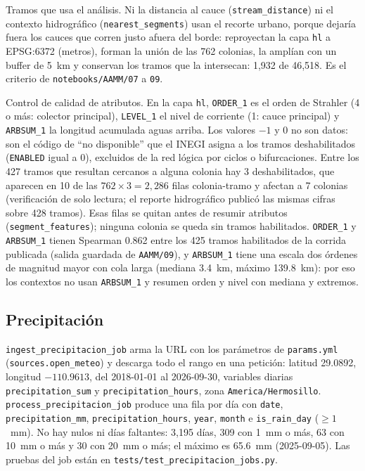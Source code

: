 \documentclass[11pt]{article}
\newcommand{\cod}[1]{\nolinkurl{#1}}
\begin{document}
Tramos que usa el análisis. Ni la distancia al cauce (\cod{stream_distance}) ni el contexto hidrográfico (\cod{nearest_segments}) usan el recorte urbano, porque dejaría fuera los cauces que corren justo afuera del borde: reproyectan la capa \cod{hl} a EPSG:6372 (metros), forman la unión de las 762 colonias, la amplían con un buffer de 5~km y conservan los tramos que la intersecan: 1,932 de 46,518. Es el criterio de \cod{notebooks/AAMM/07} a \cod{09}.

Control de calidad de atributos. En la capa \cod{hl}, \cod{ORDER_1} es el orden de Strahler (4 o más: colector principal), \cod{LEVEL_1} el nivel de corriente (1: cauce principal) y \cod{ARBSUM_1} la longitud acumulada aguas arriba. Los valores $-1$ y 0 no son datos: son el código de ``no disponible'' que el INEGI asigna a los tramos deshabilitados (\cod{ENABLED} igual a 0), excluidos de la red lógica por ciclos o bifurcaciones. Entre los 427 tramos que resultan cercanos a alguna colonia hay 3 deshabilitados, que aparecen en 10 de las $762\times 3=2{,}286$ filas colonia-tramo y afectan a 7 colonias (verificación de solo lectura; el reporte hidrográfico publicó las mismas cifras sobre 428 tramos). Esas filas se quitan antes de resumir atributos (\cod{segment_features}); ninguna colonia se queda sin tramos habilitados. \cod{ORDER_1} y \cod{ARBSUM_1} tienen Spearman 0.862 entre los 425 tramos habilitados de la corrida publicada (salida guardada de \cod{AAMM/09}), y \cod{ARBSUM_1} tiene una escala dos órdenes de magnitud mayor con cola larga (mediana 3.4~km, máximo 139.8~km): por eso los contextos no usan \cod{ARBSUM_1} y resumen orden y nivel con mediana y extremos.

\subsection{Precipitación}

\cod{ingest_precipitacion_job} arma la URL con los parámetros de \cod{params.yml} (\cod{sources.open_meteo}) y descarga todo el rango en una petición: latitud 29.0892, longitud $-110.9613$, del 2018-01-01 al 2026-09-30, variables diarias \cod{precipitation_sum} y \cod{precipitation_hours}, zona \cod{America/Hermosillo}. \cod{process_precipitacion_job} produce una fila por día con \cod{date}, \cod{precipitation_mm}, \cod{precipitation_hours}, \cod{year}, \cod{month} e \cod{is_rain_day} ($\geq 1$~mm). No hay nulos ni días faltantes: 3,195 días, 309 con 1~mm o más, 63 con 10~mm o más y 30 con 20~mm o más; el máximo es 65.6~mm (2025-09-05). Las pruebas del job están en \cod{tests/test_precipitacion_jobs.py}.
\end{document}
